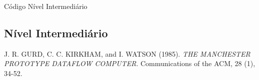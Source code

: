 \documentclass{beamer}
\begin{document}
\begin{frame}{Código Nível Intermediário}
	\subsection{Nível Intermediário}
	
\end{frame}

\begin{frame}
	\begin{thebibliography}{1}

	J. R. GURD, C. C. KIRKHAM, and I. WATSON (1985). {\em THE MANCHESTER PROTOTYPE DATAFLOW COMPUTER}. Communications of the ACM, 28 (1), 34-52.

	\end{thebibliography}
\end{frame}
\end{document}
